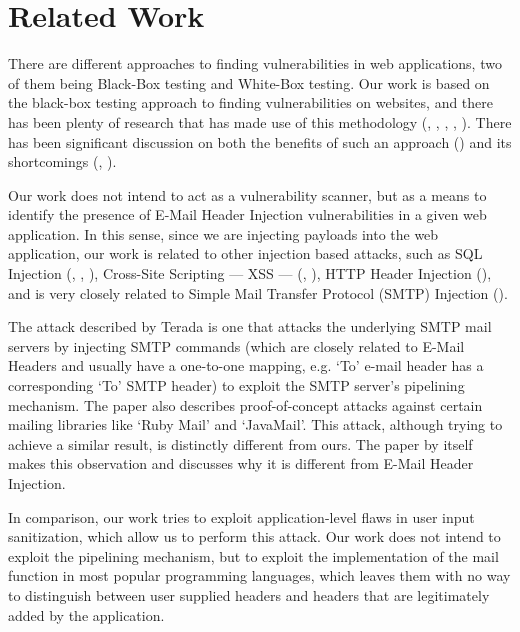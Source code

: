 \chapter{Related Work}

There are different approaches to finding vulnerabilities in web applications, two of them being Black-Box testing and White-Box testing.
Our work is based on the black-box testing approach to finding vulnerabilities on websites, and there has been plenty of research that has made use of this methodology (\cite{Beizer:1995:BTT:202699}, \cite{Huang}, \cite{kals2006secubat}, \cite{payet13:ears-in-the-wild}, \cite{zanero2005automatic}). There has been significant discussion on both the benefits of such an approach (\cite{black-box}) and its shortcomings (\cite{Doupe2012}, \cite{Doupe2010}).

Our work does not intend to act as a vulnerability scanner, but as a means to identify the presence of E-Mail Header Injection vulnerabilities in a given web application. In this sense, since we are injecting payloads into the web application, our work is related to other injection based attacks, such as SQL Injection (\cite{sql1}, \cite{sql0}, \cite{sql2}), Cross-Site Scripting --- XSS --- (\cite{Injection1}, \cite{KleinAmit}), HTTP Header Injection (\cite{sessionride}), and is very closely related to Simple Mail Transfer Protocol (SMTP) Injection (\cite{Terada2015}).

The attack described by Terada \cite{Terada2015} is one that attacks the underlying SMTP mail servers by injecting SMTP commands (which are closely related to E-Mail Headers and usually have a one-to-one mapping, e.g. `To' e-mail header has a corresponding `To' SMTP header) to exploit the SMTP server's pipelining mechanism. The paper also describes proof-of-concept attacks against certain mailing libraries like `Ruby Mail' and `JavaMail'. This attack, although trying to achieve a similar result, is distinctly different from ours. The paper by itself makes this observation and discusses why it is different from E-Mail Header Injection.

In comparison, our work tries to exploit application-level flaws in user input sanitization, which allow us to perform this attack. Our work does not intend to exploit the pipelining mechanism, but to exploit the implementation of the mail function in most popular programming languages, which leaves them with no way to distinguish between user supplied headers and headers that are legitimately added by the application.

